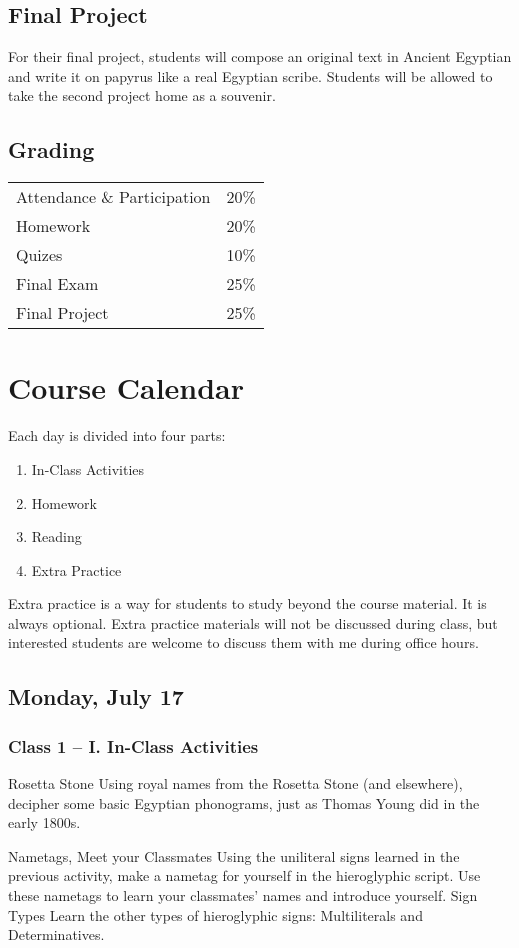 \documentclass[11pt]{article}
\begin{document}
		\subsection*{Final Project}
			For their final project, students will compose an original text in Ancient Egyptian
			 and write it on papyrus like a real Egyptian scribe. 
			Students will be allowed to take the second project home as a souvenir.
			
			
		\subsection*{Grading}
			\begin{tabular}{l l}
				Attendance \& Participation & 20\% \\
				Homework & 20\% \\
				Quizes & 10\% \\
				Final Exam & 25\% \\
				Final Project & 25\% \\
			\end{tabular}
	
	\section*{Course Calendar}
	
	Each day is divided into four parts: 
	\begin{enumerate}
	\item In-Class Activities
	\item Homework
	\item Reading
	\item Extra Practice
	\end{enumerate}
	
	Extra practice is a way for students to study beyond the course material.
	It is always optional.
	Extra practice materials will not be discussed during class, but interested students are welcome to discuss them with me during office hours.
	
	\subsection*{Monday, July 17}
		\subsubsection*{Class 1 -- I. In-Class Activities}
			\begin{outline}[itemize]
				\1 Rosetta Stone
					\2 Using royal names from the Rosetta Stone (and elsewhere), 
						decipher some basic Egyptian phonograms, 
						just as Thomas Young did in the early 1800s.
				
				\1 Nametags, Meet your Classmates
					\2 Using the uniliteral signs learned in the previous activity, make a nametag for yourself in the hieroglyphic script.
						Use these nametags to learn your classmates' names and introduce yourself.
				\1 Sign Types
					\2 Learn the other types of hieroglyphic signs: Multiliterals and Determinatives.
						
			\end{outline}
			
\end{document}
